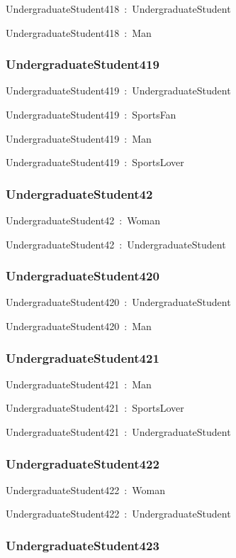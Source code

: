 \documentclass{article}
\begin{document}
UndergraduateStudent418~:~UndergraduateStudent

UndergraduateStudent418~:~Man

\subsubsection*{UndergraduateStudent419}

UndergraduateStudent419~:~UndergraduateStudent

UndergraduateStudent419~:~SportsFan

UndergraduateStudent419~:~Man

UndergraduateStudent419~:~SportsLover

\subsubsection*{UndergraduateStudent42}

UndergraduateStudent42~:~Woman

UndergraduateStudent42~:~UndergraduateStudent

\subsubsection*{UndergraduateStudent420}

UndergraduateStudent420~:~UndergraduateStudent

UndergraduateStudent420~:~Man

\subsubsection*{UndergraduateStudent421}

UndergraduateStudent421~:~Man

UndergraduateStudent421~:~SportsLover

UndergraduateStudent421~:~UndergraduateStudent

\subsubsection*{UndergraduateStudent422}

UndergraduateStudent422~:~Woman

UndergraduateStudent422~:~UndergraduateStudent

\subsubsection*{UndergraduateStudent423}
\end{document}
